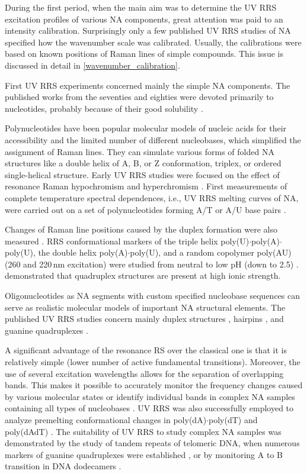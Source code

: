 During the first period, when the main aim was to determine the UV RRS
excitation profiles of various NA components, great attention was paid to an
intensity calibration.
Surprisingly only a few published UV RRS studies of NA specified how the
wavenumber scale was calibrated.
Usually, the calibrations were based on known positions of Raman lines of
simple compounds.
This issue is discussed in detail in
\cref{wavenumber_calibration}.

First UV RRS experiments concerned mainly the simple NA components.
The published works from the seventies and eighties were devoted primarily to
nucleotides, probably because of their good solubility
\parencite{Tsuboi1974}.

Polynucleotides have been popular molecular models of nucleic acids for their
accessibility and the limited number of different nucleobases, which simplified
the assignment of Raman lines.
They can simulate various forms of folded NA structures like a double
helix of A, B, or Z conformation, triplex, or ordered single-helical structure.
Early UV RRS studies were focused on the effect of resonance Raman
hypochromism
\parencite{Pezolet1975}
and hyperchromism
\parencite{Chinsky1980}.
First measurements of complete temperature spectral dependences, i.e., UV RRS
melting curves of NA, were carried out on a set of polynucleotides forming A/T
or A/U base pairs
\parencite{Jolles1985}.

Changes of Raman line positions caused by the duplex formation were also
measured
\parencite{Grygon1990}.
RRS conformational markers of the triple helix
poly(U)$\cdot$poly(A)$\cdot$poly(U), the double helix poly(A)$\cdot$poly(U),
and a random copolymer poly(AU) (260 and 220\,nm excitation) were studied from
neutral to low pH (down to 2.5)
\parencite{Gfrorer1993a}.
\textcite{Wheeler1996}
demonstrated that quadruplex structures are present at
high ionic strength.

Oligonucleotides as NA segments with custom specified nucleobase sequences
can serve as realistic molecular models of important NA structural elements.
The published UV RRS studies concern mainly duplex structures
\parencite{Laigle1986},
hairpins
\parencite{Refregiers1997},
and guanine quadruplexes
\parencite{Mukerji1995}.

A significant advantage of the resonance RS over the classical one is that it
is relatively simple (lower number of active fundamental transitions).
Moreover, the use of several excitation wavelengths allows for the separation
of overlapping bands.
This makes it possible to accurately monitor the frequency changes caused by
various molecular states or identify individual bands in complex NA samples
containing all types of nucleobases
\parencite{Mukerji1995}.
UV RRS was also successfully employed to analyze premelting conformational
changes in poly(dA)$\cdot$poly(dT) and poly(dAdT)
\parencite{Chan1997}.
The suitability of UV RRS to study complex NA samples was demonstrated by the
study of tandem repeats of telomeric DNA, when numerous markers of guanine
quadruplexes were established
\parencite{Krafft2002},
or by monitoring A to B transition in DNA dodecamers
\parencite{Knee2008}.
